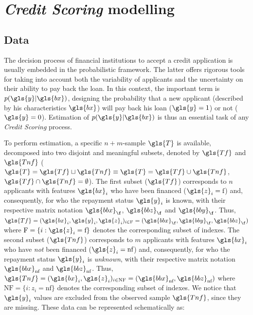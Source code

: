 \section{\textit{Credit Scoring} modelling} \label{sec:criteres}

\subsection{Data} 

The decision process of financial institutions to accept a credit application is usually embedded in the  probabilistic framework. The latter offers rigorous tools for taking into account both the variability of applicants and the uncertainty on their ability to pay back the loan. In this context, the important term is $p(\gls{y}|\gls{bx})$, designing the probability that a new applicant (described by his characteristics $\gls{bx}$) will pay back his loan ($\gls{y}=1$) or not ($\gls{y}=0$). Estimation of $p(\gls{y}|\gls{bx})$ is thus an essential task of any \textit{Credit Scoring} process.

To perform estimation, a specific $n + m$-sample $\gls{T}$ is available, decomposed into two disjoint and meaningful subsets, denoted by $\gls{Tf}$ and $\gls{Tnf}$ ($\gls{T}=\gls{Tf} \sqcup \gls{Tnf} \equiv \gls{T}=\gls{Tf} \cup \gls{Tnf}$, $\gls{Tf} \cap \gls{Tnf}=\emptyset$). The first subset ($\gls{Tf}$) corresponds to $n$ applicants with features $\gls{bx}_i$ who have been financed ($\gls{z}_i={\text{f}}$) and, consequently, for who the repayment status $\gls{y}_i$ is known, with their respective matrix notation $\gls{bbx}_\f$, $\gls{bbz}_\f$ and $\gls{bby}_\f$. Thus, $\gls{Tf}=(\gls{bx}_i,\gls{y}_i,\gls{z}_i)_{i\in \text{F}} = (\gls{bbx}_\f,\gls{bby}_\f,\gls{bbz}_\f)$ where $\text{F}=\{i:\gls{z}_i={\text{f}}\}$ denotes the corresponding subset of indexes. The second subset ($\gls{Tnf}$) corresponds to $m$ applicants with features $\gls{bx}_i$ who have {\it not} been financed ($\gls{z}_i={\text{nf}}$) and, consequently, for who the repayment status $\gls{y}_i$ is {\it unknown}, with their respective matrix notation $\gls{bbx}_{\text{nf}}$ and $\gls{bbz}_{\text{nf}}$. Thus, $\gls{Tnf}=(\gls{bx}_i,\gls{z}_i)_{i\in \text{NF}} = (\gls{bbx}_{\text{nf}}, \gls{bbz}_{\text{nf}})$ where $\text{NF}=\{i:z_i={\text{nf}}\}$ denotes the corresponding subset of indexes. We notice that $\gls{y}_i$ values are excluded from the observed sample $\gls{Tnf}$, since they are missing. These data can be represented schematically as:

